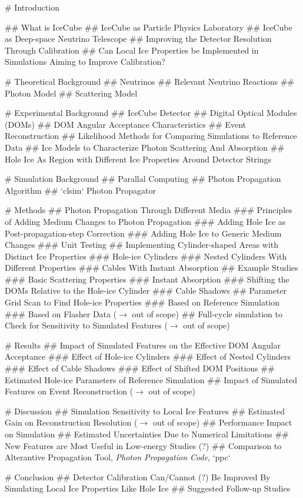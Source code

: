 
\tableofcontents

# Introduction

## What is IceCube
## IceCube as Particle Physics Laboratory
## IceCube as Deep-space Neutrino Telescope
## Improving the Detector Resolution Through Calibration
## Can Local Ice Properties be Implemented in Simulations Aiming to Improve Calibration?

# Theoretical Background
## Neutrinos
## Relevant Neutrino Reactions
## Photon Model
## Scattering Model

# Experimental Background
## IceCube Detector
## Digital Optical Modules (DOMs)
## DOM Angular Acceptance Characteristics
## Event Reconstruction
## Likelihood Methods for Comparing Simulations to Reference Data
## Ice Models to Characterize Photon Scattering And Absorption
## Hole Ice As Region with Different Ice Properties Around Detector Strings

# Simulation Background
## Parallal Computing
## Photon Propagation Algorithm
## `clsim` Photon Propagator

# Methods
## Photon Propagation Through Different Media
### Principles of Adding Medium Changes to Photon Propagation
### Adding Hole Ice as Post-propagation-step Correction
### Adding Hole Ice to Generic Medium Changes
### Unit Testing
## Implementing Cylinder-shaped Areas with Distinct Ice Properties
### Hole-ice Cylinders
### Nested Cylinders With Different Properties
### Cables With Instant Absorption
## Example Studies
### Basic Scattering Properties
### Instant Absorption
### Shifting the DOMs Relative to the Hole-ice Cylinder
### Cable Shadows
## Parameter Grid Scan to Find Hole-ice Properties
### Based on Reference Simulation
### Based on Flasher Data ($\rightarrow$ out of scope)
## Full-cycle simulation to Check for Sensitivity to Simulated Features ($\rightarrow$ out of scope)

# Results
## Impact of Simulated Features on the Effective DOM Angular Acceptance
### Effect of Hole-ice Cylinders
### Effect of Nested Cylinders
### Effect of Cable Shadows
### Effect of Shifted DOM Positions
## Estimated Hole-ice Parameters of Reference Simulation
## Impact of Simulated Features on Event Reconstruction ($\rightarrow$ out of scope)

# Discussion
## Simulation Sensitivity to Local Ice Features
## Estimated Gain on Reconstruction Resolution ($\rightarrow$ out of scope)
## Performance Impact on Simulation
## Estimated Uncertainties Due to Numerical Limitations
## New Features are Most Useful in Low-energy Studies (?)
## Comparison to Alterantive Propagation Tool, \textit{Photon Propagation Code}, `ppc`

# Conclusion
## Detector Calibration Can/Cannot (?) Be Improved By Simulating Local Ice Properties Like Hole Ice
## Suggested Follow-up Studies

